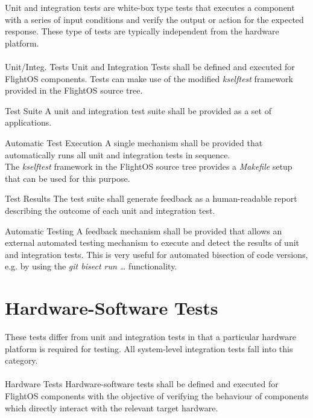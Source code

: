 \noindent
Unit and integration tests are white-box type tests that executes a component
with a series of input conditions and verify the output or action for the
expected response. These type of tests are typically independent from the
hardware platform.\\
\\

 {Unit/Integ. Tests}{%
Unit and Integration Tests shall be defined and executed for FlightOS components.
}{Tests can make use of the modified \emph{kselftest} framework provided %
in the FlightOS source tree.
}%

 {Test Suite}{%
A unit and integration test suite shall be provided as a set of applications.
}{}%

 {Automatic Test Execution}{%
A single mechanism shall be provided that automatically runs all unit and %
integration tests in sequence.\\
}{
The \emph{kselftest} framework in the FlightOS source tree provides a %
\emph{Makefile} setup that can be used for this purpose.}%

 {Test Results}{%
The test suite shall generate feedback as a human-readable report describing the %
outcome of each unit and integration test.%
}{}

 {Automatic Testing}{%
A feedback mechanism shall be provided that allows an external automated %
testing mechanism to execute and detect the results of unit and integration %
tests.%
}{This is very useful for automated bisection of code versions, e.g. by %
using the \emph{git bisect run \ldots} functionality.}%


\section {Hardware-Software Tests}

These tests differ from unit and integration tests in that a particular hardware
platform is required for testing. All system-level integration tests fall into
this category.\\
\\

 {Hardware Tests}{%
Hardware-software tests shall be defined and executed for FlightOS components %
with the objective of verifying the behaviour of components which directly %
interact with the relevant target hardware.%
}{}

